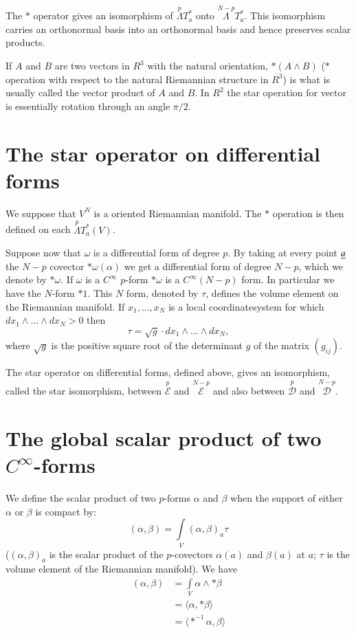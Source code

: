 The $\ast$ operator gives an isomorphism of
$\overset{p}{\Lambda}T^{\ast}_{a}$ onto
$\overset{N-p}{\Lambda}T^{\ast}_{a}$. This isomorphism carries an
orthonormal basis into an orthonormal basis and hence preserves scalar
products. 

If $A$ and $B$ are two vectors in $R^{3}$ with the natural
orientation, $\ast(A\wedge B)$ ($\ast$ operation with respect to the
natural Riemannian structure in $R^{3}$) is what is usually called the
vector product of $A$ and $B$. In $R^{2}$ the star operation for
vector is essentially rotation through an angle $\pi/2$.

\section*{The star operator on differential forms}

We suppose that $V^{N}$ is a oriented Riemannian manifold. The $\ast$
operation is then defined on each
$\overset{p}{\Lambda}T^{\ast}_{a}(V)$.

Suppose now that $\omega$ is a differential form of degree $p$. By
taking at every point $\underline{a}$ the $N-p$ covector $\ast\omega(\alpha)$
we get a differential form of degree $N-p$, which we denote by
$\ast\omega$. If $\omega$ is a $C^{\infty}$ $p$-form $\ast\omega$ is a
$C^{\infty}(N-p)$ form. In particular we have the $N$-form $\ast
1$. This $N$ form, denoted by $\tau$, defines the volume element on
the Riemannian manifold. If $x_{1},\ldots,x_{N}$ is a local
coordinate\pageoriginale system for which $dx_{1}\wedge\ldots\wedge
dx_{N}>0$ then 
$$
\tau=\sqrt{g}\cdot dx_{1}\wedge\ldots\wedge dx_{N},
$$
where $\sqrt{g}$ is the positive square root of the determinant $g$ of
the matrix $(g_{ij})$.

The star operator on differential forms, defined above, gives an
isomorphism, called the star isomorphism, between
$\overset{p}{\mathscr{E}}$ and $\overset{N-p}{\mathscr{E}}$ and also
between $\overset{p}{\mathscr{D}}$ and $\overset{N-p}{\mathscr{D}}$. 

\section*{The global scalar product of two $C^{\infty}$-forms}

We define the scalar product of two $p$-forms $\alpha$ and $\beta$
when the support of either $\alpha$ or $\beta$ is compact by:
$$
(\alpha,\beta)=\int\limits_{V}(\alpha,\beta)_{a}\tau
$$
($(\alpha,\beta)_{a}$ is the scalar product of the $p$-covectors
$\alpha(a)$ and $\beta(a)$ at $a$; $\tau$ is the volume element of the
Riemannian manifold). We have
\begin{align*}
(\alpha,\beta) &= \int\limits_{V}\alpha\wedge\ast \beta\\
 &= \langle \alpha,\ast\beta\rangle\\
 &= \langle\ast^{-1}\alpha,\beta\rangle
\end{align*}

